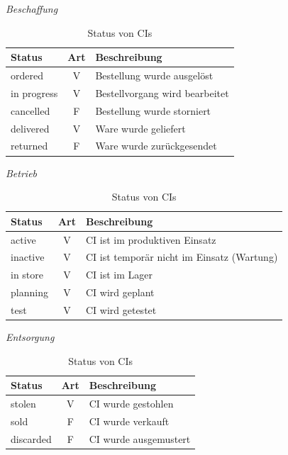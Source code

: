 \begin{table}[H]
\centering

\textit{Beschaffung}\\
\begin{tabularx}{.8\textwidth}{p{2cm}|c|X}
    Status      &  Art & Beschreibung                          \\\hline
    ordered     &  V & Bestellung wurde ausgelöst                 \\
    in progress &  V & Bestellvorgang wird bearbeitet             \\
    cancelled   &  F & Bestellung wurde storniert                 \\
    delivered   &  V & Ware wurde geliefert                       \\
    returned    &  F & Ware wurde zurückgesendet                  \\
\end{tabularx}

\bigskip\textit{Betrieb}\\
\begin{tabularx}{.8\textwidth}{p{2cm}|c|X}
    Status      &  Art & Beschreibung                          \\\hline
    active      &  V & CI ist im produktiven Einsatz              \\
    inactive    &  V & CI ist temporär nicht im Einsatz (Wartung) \\
    in store    &  V & CI ist im Lager                            \\
    planning    &  V & CI wird geplant                            \\
    test        &  V & CI wird getestet                           \\
\end{tabularx}

\bigskip\textit{Entsorgung}\\
\begin{tabularx}{.8\textwidth}{p{2cm}|c|X}
    Status      &  Art & Beschreibung                          \\\hline
    stolen      &  V & CI wurde gestohlen                         \\
    sold        &  F & CI wurde verkauft                          \\
    discarded   &  F & CI wurde ausgemustert                      \\
\end{tabularx}

\caption{Status von \aclp{CI}}
\label{tab:statci}
\end{table}


